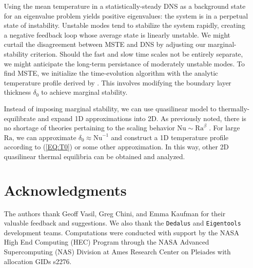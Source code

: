 \documentclass[reprint,amsmath,amssymb,aps]{revtex4-1}
\newcommand\Ra{\mathrm{Ra}}
\newcommand\Nu{\mathrm{Nu}}
\newcommand{\eq}[1]{(\ref{#1})}
\begin{document}
Using the mean temperature in a statistically-steady DNS as a background state for an eigenvalue problem yields positive eigenvalues: the system is in a perpetual state of instability. 
Unstable modes tend to stabilize the system rapidly, creating a negative feedback loop whose average state is linearly unstable. 
We might curtail the disagreement between MSTE and DNS by adjusting our marginal-stability criterion. 
Should the fast and slow time scales not be entirely separate, we might anticipate the long-term persistance of moderately unstable modes. 
To find MSTE, we initialize the time-evolution algorithm with the analytic temperature profile derived by \cite{Shishkina}.
This involves modifying the boundary layer thickness $\delta_0$ to achieve marginal stability.

Instead of imposing marginal stability, we can use quasilinear model to thermally-equilibrate and expand 1D approximations into 2D.
As previously noted, there is no shortage of theories pertaining to the scaling behavior $\Nu \sim \Ra^{\beta}$ \cite{Malkus_1954, Howard_1966, Kraichnan, Spiegel, Castaing, Grossman, Ahlers}.
For large $\Ra$, we can approximate $\delta_0 \approx \Nu^{-1}$ and construct a 1D temperature profile according to \eq{EQ:T0} or some other approximation.
In this way, other 2D quasilinear thermal equilibria can be obtained and analyzed. 

\section*{Acknowledgments}
The authors thank Geoff Vasil, Greg Chini, and Emma Kaufman for their valuable feedback and suggestions. 
We also thank the \texttt{Dedalus} and \texttt{Eigentools} development teams. 
Computations were conducted with support by the NASA High End Computing (HEC) Program through the NASA Advanced Supercomputing (NAS) Division at Ames Research Center on Pleiades with allocation GIDs s2276.

\appendix
\end{document}
